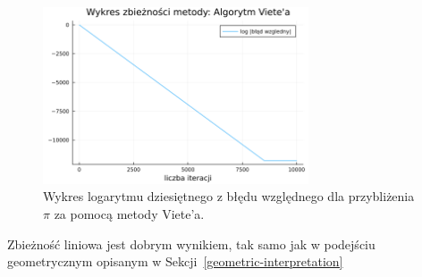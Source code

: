 \begin{figure}[!h]\centering
    \renewcommand{\figurename}{Wykres}
    \includegraphics[width=0.7\textwidth]{../prog/viete_log_error.png}
    \caption{Wykres logarytmu dziesiętnego z błędu względnego dla przybliżenia $\pi$ za pomocą metody Viete'a.}
    \label{viete-error}
\end{figure}

Zbieżność liniowa jest dobrym wynikiem, tak samo jak w podejściu geometrycznym opisanym w Sekcji~\ref{geometric-interpretation}
